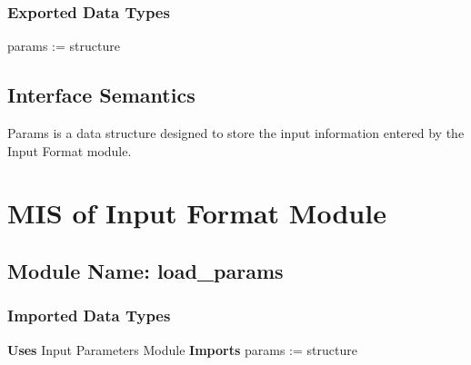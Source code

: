 \documentclass[12pt]{article}
\begin{document}

\subsubsection{Exported Data Types}

params := structure



\subsection{Interface Semantics}

Params is a data structure designed to store the input information entered by the Input Format module.



\section{MIS of Input Format Module}

\subsection{Module Name: load\_{params}}



\subsubsection{Imported Data Types}
\textbf{Uses} Input Parameters Module \textbf{Imports} params := structure 

\end{document}
